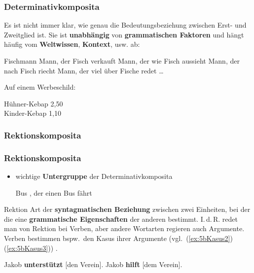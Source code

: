 \begin{frame}
\frametitle{Determinativkomposita}
	
Es ist nicht immer klar, wie genau die Bedeutungsbeziehung zwischen Erst- und Zweitglied ist. Sie ist \textbf{unabhängig} von \textbf{grammatischen Faktoren} und hängt häufig vom \textbf{Weltwissen}, \textbf{Kontext}, usw. ab:
	
	\ea Fischmann
		\ea Mann, der Fisch verkauft
		\ex Mann, der wie Fisch aussieht
		\ex Mann, der nach Fisch riecht
		\ex Mann, der viel über Fische redet
		\ex \ldots 
		\z 

\pause 
		
	\ex Auf einem Werbeschild:
	
	Hühner-Kebap 2,50\\
	Kinder-Kebap 1,10 
	\z
	
	
\end{frame}


\subsubsection{Rektionskomposita}


\begin{frame}
\frametitle{Rektionskomposita}

\begin{itemize}
	\item wichtige \textbf{Untergruppe} der Determinativkomposita
	
	\ea Bus \ras {}, der einen Bus fährt
	\z 
\end{itemize}

\pause 

\begin{block}{Rektion}
	Art der \textbf{syntagmatischen Beziehung} zwischen zwei Einheiten, bei der die eine \textbf{grammatische Eigenschaften} der anderen bestimmt. I.\,d.\,R. redet man von Rektion bei Verben, aber andere Wortarten regieren auch Argumente.  Verben bestimmen bspw.\ den Kasus ihrer Argumente (vgl.\ (\ref{ex:5bKasus2}) \vs (\ref{ex:5bKasus3})) \citep[vgl.][]{McIntyre13a, MyP16e}.

\end{block}

\ea 
	\ea\label{ex:5bKasus2} {Jakob \textbf{unterstützt} [den Verein].}
	\ex\label{ex:5bKasus3} {Jakob \textbf{hilft} [dem Verein].}
	\z
\z  

\end{frame}


